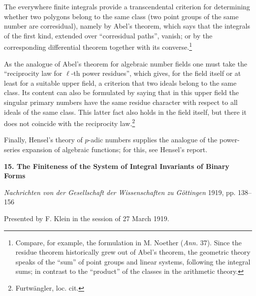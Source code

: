 \documentclass[11pt]{article}
\providecommand{\frS}{\mathfrak S}
\begin{document}
The everywhere finite integrals provide a transcendental criterion for determining whether two polygons belong to the same class (two point groups of the same number are corresidual), namely by Abel's theorem, which says that the integrals of the first kind, extended over ``corresidual paths'', vanish; or by the corresponding differential theorem together with its converse.\footnote{Compare, for example, the formulation in M. Noether (\emph{Ann.} 37). Since the residue theorem historically grew out of Abel's theorem, the geometric theory speaks of the ``sum'' of point groups and linear systems, following the integral sums; in contrast to the ``product'' of the classes in the arithmetic theory.}

As the analogue of Abel's theorem for algebraic number fields one must take the ``reciprocity law for \(\ell\)-th power residues'', which gives, for the field itself or at least for a suitable upper field, a criterion that two ideals belong to the same class. Its content can also be formulated by saying that in this upper field the singular primary numbers have the same residue character with respect to all ideals of the same class. This latter fact also holds in the field itself, but there it does not coincide with the reciprocity law.\footnote{Furtwängler, loc. cit.}

Finally, Hensel's theory of \(p\)-adic numbers supplies the analogue of the power-series expansion of algebraic functions; for this, see Hensel's report.


\providecommand{\frH}{\mathfrak H}
\providecommand{\frK}{\mathfrak K}
\providecommand{\frM}{\mathfrak M}
\providecommand{\frN}{\mathfrak N}
\providecommand{\frG}{\mathfrak G}
\providecommand{\frS}{\mathfrak S}
\providecommand{\tmod}[1]{\;(\operatorname{mod} #1)}

\clearpage
\begin{center}
{\Large\bfseries 15. The Finiteness of the System of Integral Invariants of Binary Forms}\par
\vspace{1em}
\emph{Nachrichten von der Gesellschaft der Wissenschaften zu Göttingen} 1919, pp. 138--156
\end{center}

\vspace{2em}
\begin{center}
Presented by F. Klein in the session of 27 March 1919.
\end{center}
\end{document}
